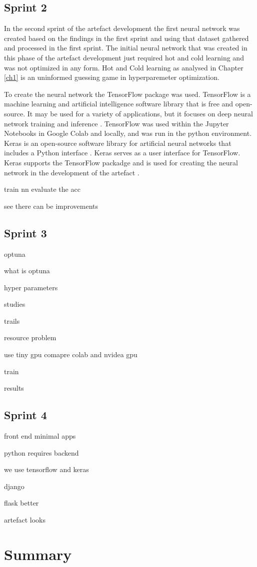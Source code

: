\subsection{Sprint 2}
 
In the second sprint of the artefact development the first neural network was created based on the findings in the first sprint and using that dataset gathered and processed in the first sprint. The initial neural network that was created in this phase of the artefact development just required hot and cold learning and was not optimized in any form. Hot and Cold learning as analysed in Chapter \ref{ch1} is an uninformed guessing game in hyperparemeter optimization.

To create the neural network the TensorFlow package was used. TensorFlow is a machine learning and artificial intelligence software library that is free and open-source. It may be used for a variety of applications, but it focuses on deep neural network training and inference \citep{tensor2016}. TensorFlow was used within the Jupyter Notebooks in Google Colab and locally, and was run in the python environment. Keras is an open-source software library for artificial neural networks that includes a Python interface \citep{kerascnn2017}. Keras serves as a user interface for TensorFlow. Keras supports the TensorFlow packadge and is used for creating the neural network in the development of the artefact \citep{kerascnn2017}.
 
train nn
evaluate the acc

see there can be improvements

\subsection{Sprint 3}

optuna 

what is optuna

hyper parameters

studies

trails

resource problem

use tiny gpu
comapre colab and nvidea gpu

train

results

\subsection{Sprint 4}

front end minimal apps

python requires backend

we use tensorflow and keras

django

flask better

artefact looks

\section{Summary}

